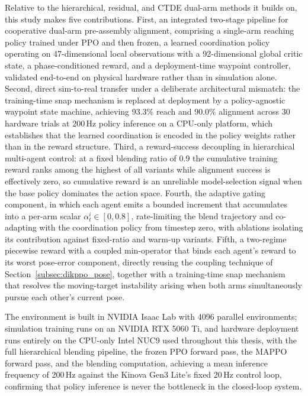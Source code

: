 Relative to the hierarchical, residual, and CTDE dual-arm methods it builds on, this study makes five
contributions. First, an integrated two-stage pipeline for cooperative dual-arm pre-assembly
alignment, comprising a single-arm reaching policy trained under PPO and then frozen, a learned
coordination policy operating on 47-dimensional local observations with a 92-dimensional global
critic state, a phase-conditioned reward, and a deployment-time waypoint controller, validated
end-to-end on physical hardware rather than in simulation alone. Second, direct sim-to-real transfer
under a deliberate architectural mismatch: the training-time snap mechanism is replaced at deployment
by a policy-agnostic waypoint state machine, achieving 93.3\% reach and 90.0\% alignment across 30
hardware trials at 200\,Hz policy inference on a CPU-only platform, which establishes that the learned
coordination is encoded in the policy weights rather than in the reward structure. Third, a
reward-success decoupling in hierarchical multi-agent control: at a fixed blending ratio of 0.9 the
cumulative training reward ranks among the highest of all variants while alignment success is
effectively zero, so cumulative reward is an unreliable model-selection signal when the base policy
dominates the action space. Fourth, the adaptive gating component, in which each agent emits a
bounded increment that accumulates into a per-arm scalar $\alpha_t^i \in [0, 0.8]$, rate-limiting the
blend trajectory and co-adapting with the coordination policy from timestep zero, with ablations
isolating its contribution against fixed-ratio and warm-up variants. Fifth, a two-regime piecewise
reward with a coupled min-operator that binds each agent's reward to its worst pose-error component,
directly reusing the coupling technique of Section~\ref{subsec:dikppo_pose}, together with a
training-time snap mechanism that resolves the moving-target instability arising when both arms
simultaneously pursue each other's current pose.

The environment is built in NVIDIA Isaac Lab with 4096 parallel environments; simulation training
runs on an NVIDIA RTX 5060 Ti, and hardware deployment runs entirely on the CPU-only Intel NUC9 used
throughout this thesis, with the full hierarchical blending pipeline, the frozen PPO forward pass,
the MAPPO forward pass, and the blending computation, achieving a mean inference frequency of
200\,Hz against the Kinova Gen3 Lite's fixed 20\,Hz control loop, confirming that policy inference
is never the bottleneck in the closed-loop system.

